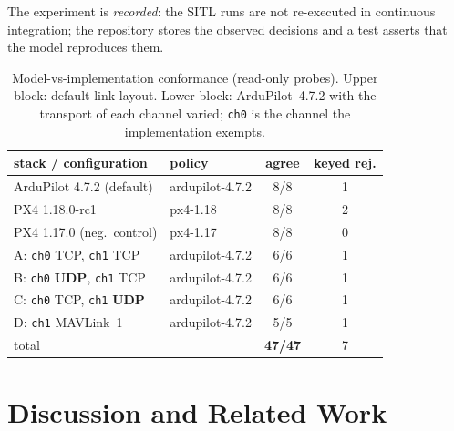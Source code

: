 \documentclass[conference]{IEEEtran}
\newcommand{\code}[1]{\texttt{#1}}
\begin{document}
The experiment is \emph{recorded}: the SITL
runs are not re-executed in continuous integration; the repository stores the
observed decisions and a test asserts that the model reproduces them.

\begin{table}[t]
\caption{Model-vs-implementation conformance (read-only probes). Upper block:
default link layout. Lower block: ArduPilot~4.7.2 with the transport of each
channel varied; \code{ch0} is the channel the implementation exempts.}
\label{tab:conf}
\centering\footnotesize
\begin{tabular}{@{}llcc@{}}
\toprule
stack / configuration & policy & agree & keyed rej. \\
\midrule
ArduPilot 4.7.2 (default) & \textsf{ardupilot-4.7.2} & 8/8 & 1 \\
PX4 1.18.0-rc1            & \textsf{px4-1.18}        & 8/8 & 2 \\
PX4 1.17.0 (neg.\ control) & \textsf{px4-1.17}       & 8/8 & 0 \\
\midrule
A: \code{ch0} TCP, \code{ch1} TCP & \textsf{ardupilot-4.7.2} & 6/6 & 1 \\
B: \code{ch0} \textbf{UDP}, \code{ch1} TCP & \textsf{ardupilot-4.7.2} & 6/6 & 1 \\
C: \code{ch0} TCP, \code{ch1} \textbf{UDP} & \textsf{ardupilot-4.7.2} & 6/6 & 1 \\
D: \code{ch1} MAVLink~1 & \textsf{ardupilot-4.7.2} & 5/5 & 1 \\
\midrule
total & & \textbf{47/47} & 7 \\
\bottomrule
\end{tabular}
\end{table}

\section{Discussion and Related Work}
\label{sec:disc}
\end{document}
